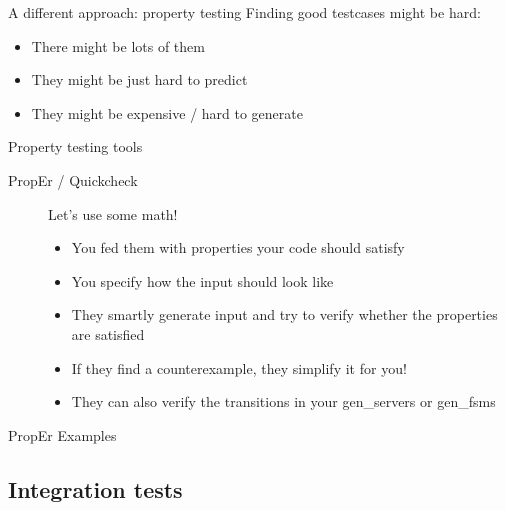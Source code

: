 \documentclass[pdf]{beamer}
\begin{document}
\begin{frame}{A different approach: property testing}
    Finding good testcases might be hard:
    \begin{itemize}
    \item There might be lots of them
    \pause
    \item They might be just hard to predict
    \pause
    \item They might be expensive / hard to generate
    \end{itemize}
\end{frame}

\begin{frame}{Property testing tools}
    \begin{description}
    \item [PropEr / Quickcheck] Let's use some math!
        \begin{itemize}
        \item You fed them with properties your code should satisfy
        \item You specify how the input should look like
        \item They smartly generate input and try to verify whether the properties are satisfied
        \item If they find a counterexample, they simplify it for you!
        \item They can also verify the transitions in your gen\_servers or gen\_fsms
        \end{itemize}
    \end{description}
\end{frame}

\begin{frame}{PropEr Examples}
\end{frame}

\subsection*{Integration tests}
\label{integration_tests}
\end{document}
